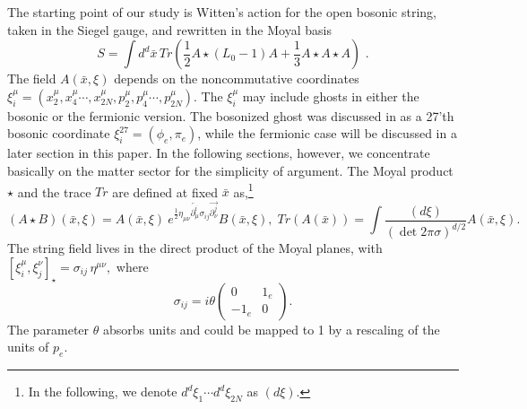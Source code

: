 \documentclass[a4paper,11pt]{article}
\begin{document}
The starting point of our study is Witten's action \cite{Witten} for the
open bosonic string, taken in the Siegel gauge, and rewritten in the Moyal
basis
\begin{equation}
S=\int d^{d}\bar{x}\,Tr\left( \frac{1}{2}A\star (L_{0}-1)A+\frac{1}{3}A\star
A\star A\right) \,\,.  \label{action}
\end{equation}%
The field $A\left( \bar{x},\xi \right) $ depends on the noncommutative
coordinates $\xi _{i}^{\mu }=\left( x_{2}^{\mu },x_{4}^{\mu }\cdots
,x_{2N}^{\mu },p_{2}^{\mu },p_{4}^{\mu }\cdots ,p_{2N}^{\mu }\right) $. The $%
\xi _{i}^{\mu }$ may include ghosts in either the bosonic or the fermionic
version. The bosonized ghost was discussed in \cite{BM2} as a 27'th bosonic
coordinate $\xi _{i}^{27}=\left( \phi _{e},\pi _{e}\right) $, while the
fermionic case will be discussed in a later section in this paper. In the
following sections, however, we concentrate basically on the matter sector
for the simplicity of argument. The Moyal product $\star $ and the trace $Tr$
are defined at fixed $\bar{x}$ as,\footnote{%
In the following, we denote $d^{d}\xi _{1}\cdots d^{d}\xi _{2N}$ as $(d\xi )$.%
}
\begin{equation}
(A\star B)(\bar{x},\xi )=A(\bar{x},\xi )~e^{\frac{1}{2}\eta _{\mu \nu }%
\overleftarrow{\partial _{\mu }^{i}}\sigma _{ij}\overrightarrow{\partial
_{\nu }^{j}}}B(\bar{x},\xi ),\;Tr\left( A\left( \bar{x}\right) \right) =\int
\frac{\left( d\xi \right) }{\left( \det 2\pi \sigma \right) ^{d/2}}A\left(
\bar{x},\xi \right) .  \label{Moyal}
\end{equation}%
The string field lives in the direct product of the Moyal planes, with $%
\left[ \xi _{i}^{\mu },\xi _{j}^{\nu }\right] _{\star }=\sigma _{ij}\,\eta
^{\mu \nu },$ where
\begin{equation}
\sigma _{ij}=i\theta \left(
\begin{array}{cc}
0 & 1_{e} \\
-1_{e} & 0%
\end{array}%
\right) .
\end{equation}%
The parameter $\theta $ absorbs units and could be mapped to 1 by a
rescaling of the units of $p_{e}.$
\end{document}
